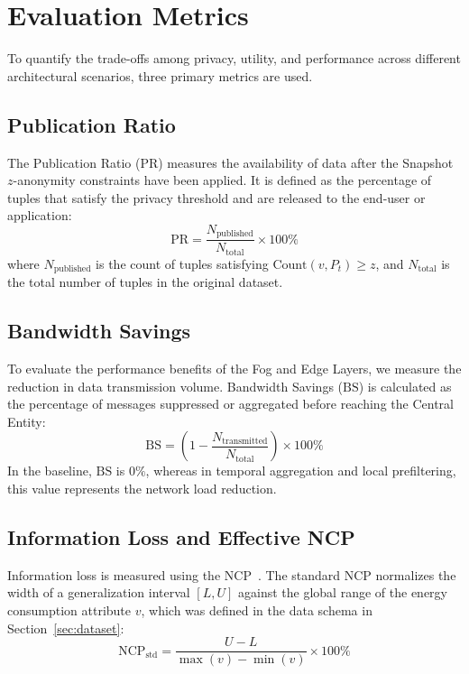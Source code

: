 \section{Evaluation Metrics}
\label{sec:evaluation_metrics}

To quantify the trade-offs among privacy, utility, and performance across different architectural scenarios, three primary metrics are used.

\subsection{Publication Ratio}
The Publication Ratio ($\text{PR}$) measures the availability of data after the Snapshot $z$-anonymity constraints have been applied. It is defined as the percentage of tuples that satisfy the privacy threshold and are released to the end-user or application:
\begin{equation}
    \text{PR} = \frac{N_{\text{published}}}{N_{\text{total}}} \times 100\%
\end{equation}
where $N_{\text{published}}$ is the count of tuples satisfying $\text{Count}(v, P_t) \geq z$, and $N_{\text{total}}$ is the total number of tuples in the original dataset.

\subsection{Bandwidth Savings}
To evaluate the performance benefits of the Fog and Edge Layers, we measure the reduction in data transmission volume. Bandwidth Savings ($\text{BS}$) is calculated as the percentage of messages suppressed or aggregated before reaching the Central Entity:
\begin{equation}
    \text{BS} = \left( 1 - \frac{N_{\text{transmitted}}}{N_{\text{total}}} \right) \times 100\%
\end{equation}
In the baseline, $\text{BS}$ is $0\%$, whereas in temporal aggregation and local prefiltering, this value represents the network load reduction.

\subsection{Information Loss and Effective NCP}
Information loss is measured using the \acf{NCP}~\cite{UtilityBasedAnonymizationNCP}. The standard \ac{NCP} normalizes the width of a generalization interval $[L, U]$ against the global range of the energy consumption attribute $v$, which was defined in the data schema in Section~\ref{sec:dataset}:
\begin{equation}
    \text{NCP}_{\text{std}} = \frac{U - L}{\max(v) - \min(v)} \times 100\%
\end{equation}

